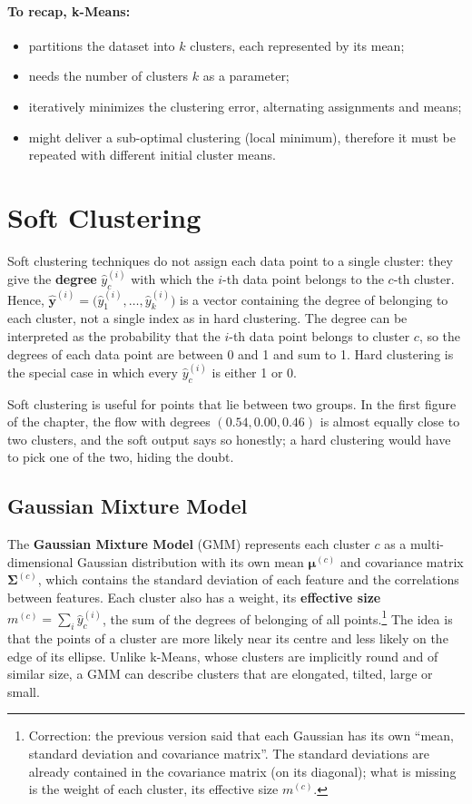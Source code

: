 \paragraph{To recap, k-Means:}
\begin{itemize}
    \item partitions the dataset into $k$ clusters, each represented by its mean;
    \item needs the number of clusters $k$ as a parameter;
    \item iteratively minimizes the clustering error, alternating assignments and means;
    \item might deliver a sub-optimal clustering (local minimum), therefore it must be repeated with different initial cluster means.
\end{itemize}

\section{Soft Clustering}
Soft clustering techniques do not assign each data point to a single cluster: they give the \textbf{degree} $\widehat{y}^{(i)}_c$ with which the $i$-th data point belongs to the $c$-th cluster. Hence, $\widehat{\mathbf{y}}^{(i)} = \big(\widehat{y}^{(i)}_1, \dots, \widehat{y}^{(i)}_k\big)$ is a vector containing the degree of belonging to each cluster, not a single index as in hard clustering. The degree can be interpreted as the probability that the $i$-th data point belongs to cluster $c$, so the degrees of each data point are between 0 and 1 and sum to 1. Hard clustering is the special case in which every $\widehat{y}^{(i)}_c$ is either 1 or 0.

Soft clustering is useful for points that lie between two groups. In the first figure of the chapter, the flow with degrees $(0.54, 0.00, 0.46)$ is almost equally close to two clusters, and the soft output says so honestly; a hard clustering would have to pick one of the two, hiding the doubt.

\subsection{Gaussian Mixture Model}
The \textbf{Gaussian Mixture Model} (GMM) represents each cluster $c$ as a multi-dimensional Gaussian distribution with its own mean $\boldsymbol{\mu}^{(c)}$ and covariance matrix $\boldsymbol{\Sigma}^{(c)}$, which contains the standard deviation of each feature and the correlations between features. Each cluster also has a weight, its \textbf{effective size} $m^{(c)} = \sum_{i} \widehat{y}^{(i)}_c$, the sum of the degrees of belonging of all points.\footnote{Correction: the previous version said that each Gaussian has its own ``mean, standard deviation and covariance matrix''. The standard deviations are already contained in the covariance matrix (on its diagonal); what is missing is the weight of each cluster, its effective size $m^{(c)}$.} The idea is that the points of a cluster are more likely near its centre and less likely on the edge of its ellipse. Unlike k-Means, whose clusters are implicitly round and of similar size, a GMM can describe clusters that are elongated, tilted, large or small.

